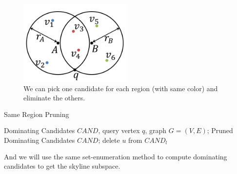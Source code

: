 \begin{figure}[h]
    \centering
      \includegraphics[width=0.5\textwidth]{figs/Circle_Spatial_Example}
    \caption{We can pick one candidate for each region (with same color) and eliminate the others.}
    \label{fig:circle_example}
\end{figure}


\begin{algorithm}[H]
  \caption{Same Region Pruning}\label{algo:blah}
  \begin{algorithmic}[1]
  \show\LOOP
    \REQUIRE Dominating Candidates $CAND$, query vertex $q$, graph $G=(V, E)$;
    \ENSURE Pruned Dominating Candidates $CAND$;
                \STATE delete $u$ from $CAND_l$
            \ENDIF
        \ENDFOR
    \ENDFOR
  \end{algorithmic}
\end{algorithm}
And we will use the same set-enumeration method to compute dominating candidates to get the skyline subspace.



